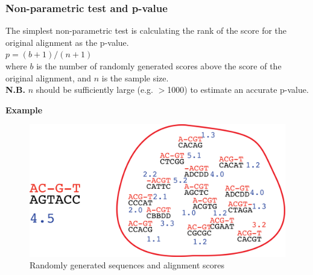 %
%
\subsubsection*{Non-parametric test and p-value} 
The simplest non-parametric test is calculating the rank of the score for the original alignment as the p-value. \\

$p=(b+1)/(n+1)$ \\

\noindent
where $b$ is the number of randomly generated scores above the score of the original alignment, and $n$ is the sample size. \\ 

\noindent
\textbf{N.B.} $n$ should be sufficiently large (e.g. $>$1000) to estimate an accurate p-value. \\

\newpage

\noindent
\textbf{Example}

\begin{figure}[H]
  \centering
      \includegraphics[width=0.5 \textwidth]{fig06/random_sequences.png}
  \caption{Randomly generated sequences and alignment scores}
\end{figure}


